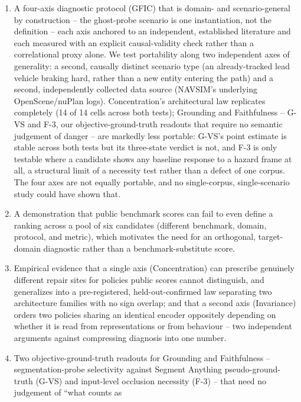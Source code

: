 \begin{enumerate}
    \item A four-axis diagnostic protocol (GFIC) that is domain- and scenario-general by
    construction -- the ghost-probe scenario is one instantiation, not the definition --
    each axis anchored to an independent, established literature and each measured with
    an explicit causal-validity check rather than a correlational proxy alone. We test
    portability along two independent axes of generality: a second, causally distinct
    scenario type (an already-tracked lead vehicle braking hard, rather than a new entity
    entering the path) and a second, independently collected data source (NAVSIM's
    underlying OpenScene/nuPlan logs). Concentration's architectural law replicates
    completely (14 of 14 cells across both tests); Grounding and Faithfulness -- G-VS and
    F-3, our objective-ground-truth readouts that require no semantic judgement of danger
    -- are markedly less portable: G-VS's point estimate is stable across both tests but
    its three-state verdict is not, and F-3 is only testable where a candidate shows any
    baseline response to a hazard frame at all, a structural limit of a necessity test
    rather than a defect of one corpus. The four axes are not equally portable, and no
    single-corpus, single-scenario study could have shown that.
    \item A demonstration that public benchmark scores can fail to even define a ranking
    across a pool of six candidates (different benchmark, domain, protocol, and metric),
    which motivates the need for an orthogonal, target-domain diagnostic rather than a
    benchmark-substitute score.
    \item Empirical evidence that a single axis (Concentration) can prescribe genuinely
    different repair sites for policies public scores cannot distinguish, and generalizes
    into a pre-registered, held-out-confirmed law separating two architecture families
    with no sign overlap; and that a second axis (Invariance) orders two policies sharing
    an identical encoder oppositely depending on whether it is read from representations
    or from behaviour -- two independent arguments against compressing diagnosis into one
    number.
    \item Two objective-ground-truth readouts for Grounding and Faithfulness --
    segmentation-probe selectivity against Segment Anything pseudo-ground-truth (G-VS) and
    input-level occlusion necessity (F-3) -- that need no judgement of ``what counts as

\end{enumerate}
